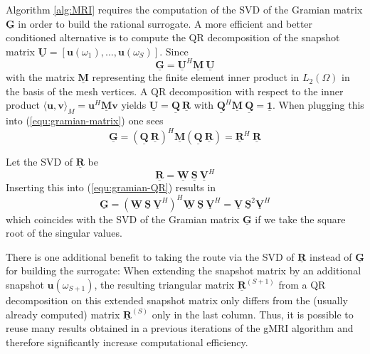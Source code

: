 \documentclass[11pt, a4paper]{article}
\begin{document}
Algorithm \ref{alg:MRI} requires the computation of the \acrfull{SVD}
of the Gramian matrix $\mathbf{\underline{G}}$ in order to build the rational
surrogate. A more efficient and better conditioned \cite{davidePHD} alternative is to compute
the QR decomposition of the snapshot matrix $\mathbf{\underline{U}} = [\mathbf{u}(\omega_1), \dots, \mathbf{u}(\omega_S)]$.
Since
\begin{equation}
    \mathbf{\underline{G}} = \mathbf{\underline{U}}^H \mathbf{\underline{M}}~\mathbf{\underline{U}} \label{equ:gramian-matrix}
\end{equation}
with the matrix $\mathbf{\underline{M}}$ representing the finite element 
inner product in $L_2(\Omega)$ in the basis of the mesh vertices.
A QR decomposition with respect to the inner product
$\langle \mathbf{u}, \mathbf{v} \rangle_M = \mathbf{u}^H \mathbf{\underline{M}} \mathbf{v}$
yields $\mathbf{\underline{U}} = \mathbf{\underline{Q}}~\mathbf{\underline{R}}$
with $\mathbf{\underline{Q}}^H \mathbf{\underline{M}}~\mathbf{\underline{Q}} = \boldsymbol{\underline{1}}$.
When plugging this into (\ref{equ:gramian-matrix}) one sees
\begin{equation}
    \mathbf{\underline{G}} = (\mathbf{\underline{Q}}~\mathbf{\underline{R}})^H \mathbf{\underline{M}} 
    (\mathbf{\underline{Q}}~\mathbf{\underline{R}}) = \mathbf{\underline{R}}^H~\mathbf{\underline{R}}
    \label{equ:gramian-QR}
\end{equation}

Let the \acrshort{SVD} of $\mathbf{\underline{R}}$ be 
\begin{equation}
    \mathbf{\underline{R}} = \mathbf{\underline{W}}~\mathbf{\underline{S}}~\mathbf{\underline{V}}^H \label{equ:qr-decomposition}
\end{equation}
Inserting this into (\ref{equ:gramian-QR}) results in
\begin{equation}
    \mathbf{\underline{G}} = (\mathbf{\underline{W}}~\mathbf{\underline{S}}~\mathbf{\underline{V}}^H)^H \mathbf{\underline{W}}~\mathbf{\underline{S}}~\mathbf{\underline{V}}^H
    = \mathbf{\underline{V}}~\mathbf{\underline{S}}^2\mathbf{\underline{V}}^H
    \label{equ:gramian-SVD}
\end{equation}
which coincides with the \acrshort{SVD} of the Gramian matrix $\mathbf{\underline{G}}$
if we take the square root of the singular values.

There is one additional benefit to taking the route via the \acrshort{SVD} of
$\mathbf{\underline{R}}$ instead of $\mathbf{\underline{G}}$
for building the surrogate: When extending the snapshot matrix by an additional
snapshot $\mathbf{u}(\omega_{S+1})$, the resulting triangular matrix $\mathbf{\underline{R}}^{(S+1)}$
from a QR decomposition on this extended snapshot matrix only differs from the 
(usually already computed) matrix $\mathbf{\underline{R}}^{(S)}$ only in the last column.
Thus, it is possible to reuse many results obtained in a previous iterations of
the \acrshort{gMRI} algorithm and therefore significantly increase computational
efficiency.
\end{document}
